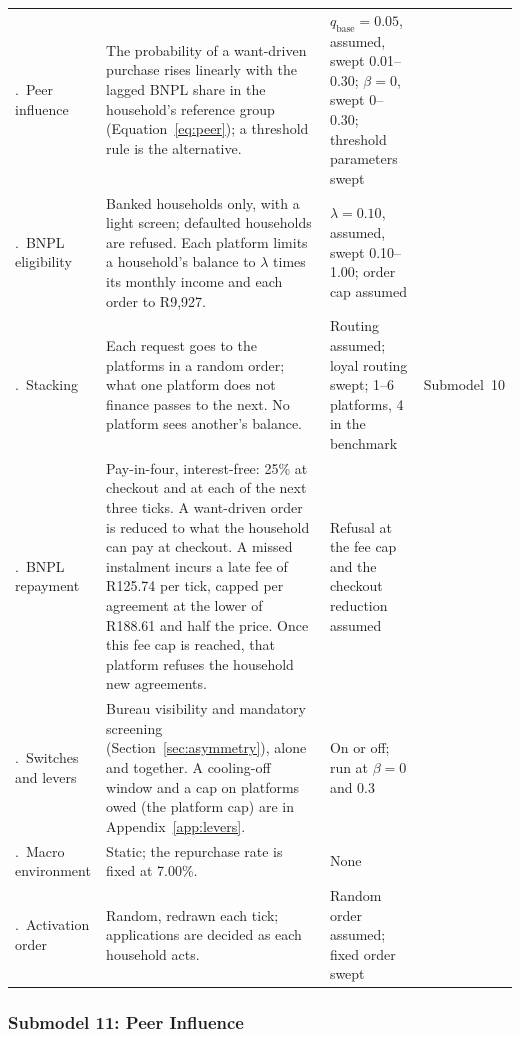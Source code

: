 \begin{longtable}{H{2.6cm}L{5.25cm}L{3.1cm}L{2.6cm}}
.~Peer influence & The probability of a want-driven purchase rises linearly with the lagged \acs{BNPL} share in the household's reference group (Equation~\ref{eq:peer}); a threshold rule is the alternative. & $q_{\text{base}} = 0.05$, assumed, swept 0.01--0.30; $\beta = 0$, swept 0--0.30; threshold parameters swept & \citet{ackert2025bnpl,cardaci2018inequality,granovetter1978threshold} \\
.~\acs{BNPL} eligibility & Banked households only, with a light screen; defaulted households are refused. Each platform limits a household's balance to $\lambda$ times its monthly income and each order to R9{,}927. & $\lambda = 0.10$, assumed, swept 0.10--1.00; order cap assumed & \citet{payflex_terms,payjustnow_terms,homechoice2024ir} \\
.~Stacking & Each request goes to the platforms in a random order; what one platform does not finance passes to the next. No platform sees another's balance. & Routing assumed; loyal routing swept; 1--6 platforms, 4 in the benchmark & Submodel~10 \\
.~\acs{BNPL} repayment & Pay-in-four, interest-free: 25\% at checkout and at each of the next three ticks. A want-driven order is reduced to what the household can pay at checkout. A missed instalment incurs a late fee of R125.74 per tick, capped per agreement at the lower of R188.61 and half the price. Once this fee cap is reached, that platform refuses the household new agreements. & Refusal at the fee cap and the checkout reduction assumed & \citet{payflex_terms} \\
.~Switches and levers & Bureau visibility and mandatory screening (Section~\ref{sec:asymmetry}), alone and together. A cooling-off window and a cap on platforms owed (the platform cap) are in Appendix~\ref{app:levers}. & On or off; run at $\beta = 0$ and 0.3 & \citet{businessday_bnpl_2026,fca_ps26_1,woolard2021} \\
.~Macro environment & Static; the repurchase rate is fixed at 7.00\%. & None & \citet{sarb_mpc_2017_03} \\
.~Activation order & Random, redrawn each tick; applications are decided as each household acts. & Random order assumed; fixed order swept & \citet{comer2013activation,alizadeh2015activation} \\
\end{longtable}
\endgroup

\subsubsection*{Submodel 11: Peer Influence}
\label{sec:peer-influence}

